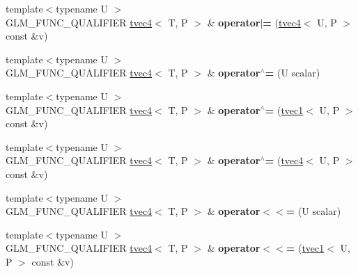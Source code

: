 \begin{DoxyCompactItemize}
\item 
\hypertarget{structglm_1_1tvec4_aabde2042533b8cf0b03d1e75de75d910}{{\footnotesize template$<$typename U $>$ }\\G\-L\-M\-\_\-\-F\-U\-N\-C\-\_\-\-Q\-U\-A\-L\-I\-F\-I\-E\-R \hyperlink{structglm_1_1tvec4}{tvec4}$<$ T, P $>$ \& {\bfseries operator$\vert$=} (\hyperlink{structglm_1_1tvec4}{tvec4}$<$ U, P $>$ const \&v)}\label{structglm_1_1tvec4_aabde2042533b8cf0b03d1e75de75d910}

\item 
\hypertarget{structglm_1_1tvec4_a7866bb2f3c4496c7b216f4d9c74b6bf7}{{\footnotesize template$<$typename U $>$ }\\G\-L\-M\-\_\-\-F\-U\-N\-C\-\_\-\-Q\-U\-A\-L\-I\-F\-I\-E\-R \hyperlink{structglm_1_1tvec4}{tvec4}$<$ T, P $>$ \& {\bfseries operator$^\wedge$=} (U scalar)}\label{structglm_1_1tvec4_a7866bb2f3c4496c7b216f4d9c74b6bf7}

\item 
\hypertarget{structglm_1_1tvec4_aeb460e85abbffbc0880712c2a32659a1}{{\footnotesize template$<$typename U $>$ }\\G\-L\-M\-\_\-\-F\-U\-N\-C\-\_\-\-Q\-U\-A\-L\-I\-F\-I\-E\-R \hyperlink{structglm_1_1tvec4}{tvec4}$<$ T, P $>$ \& {\bfseries operator$^\wedge$=} (\hyperlink{structglm_1_1tvec1}{tvec1}$<$ U, P $>$ const \&v)}\label{structglm_1_1tvec4_aeb460e85abbffbc0880712c2a32659a1}

\item 
\hypertarget{structglm_1_1tvec4_afba73ecb49a4d69ef0e832b1e294e0ca}{{\footnotesize template$<$typename U $>$ }\\G\-L\-M\-\_\-\-F\-U\-N\-C\-\_\-\-Q\-U\-A\-L\-I\-F\-I\-E\-R \hyperlink{structglm_1_1tvec4}{tvec4}$<$ T, P $>$ \& {\bfseries operator$^\wedge$=} (\hyperlink{structglm_1_1tvec4}{tvec4}$<$ U, P $>$ const \&v)}\label{structglm_1_1tvec4_afba73ecb49a4d69ef0e832b1e294e0ca}

\item 
\hypertarget{structglm_1_1tvec4_a2c231e01de8005887fd9c380f93009da}{{\footnotesize template$<$typename U $>$ }\\G\-L\-M\-\_\-\-F\-U\-N\-C\-\_\-\-Q\-U\-A\-L\-I\-F\-I\-E\-R \hyperlink{structglm_1_1tvec4}{tvec4}$<$ T, P $>$ \& {\bfseries operator$<$$<$=} (U scalar)}\label{structglm_1_1tvec4_a2c231e01de8005887fd9c380f93009da}

\item 
\hypertarget{structglm_1_1tvec4_ac1b4567b5baff2c335edef8d30e73a80}{{\footnotesize template$<$typename U $>$ }\\G\-L\-M\-\_\-\-F\-U\-N\-C\-\_\-\-Q\-U\-A\-L\-I\-F\-I\-E\-R \hyperlink{structglm_1_1tvec4}{tvec4}$<$ T, P $>$ \& {\bfseries operator$<$$<$=} (\hyperlink{structglm_1_1tvec1}{tvec1}$<$ U, P $>$ const \&v)}\label{structglm_1_1tvec4_ac1b4567b5baff2c335edef8d30e73a80}


\end{DoxyCompactItemize}
